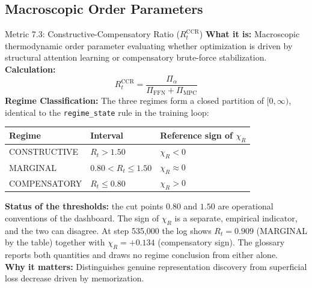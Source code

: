 \documentclass[11pt,a4paper]{article}
\begin{document}
\subsection{Macroscopic Order Parameters}
\begin{metricbox}{Metric 7.3: Constructive-Compensatory Ratio ($R_t^{\text{CCR}}$)}
\textbf{What it is:} Macroscopic thermodynamic order parameter evaluating whether optimization is driven by structural attention learning or compensatory brute-force stabilization.\\
\textbf{Calculation:}
 $$R_t^{\text{CCR}} = \frac{\Pi_\alpha}{\Pi_{\text{FFN}} + \Pi_{\text{MPC}}}$$ \textbf{Regime Classification:} The three regimes form a closed partition of $[0,\infty)$, identical to the \texttt{regime\_state} rule in the training loop:
\begin{center}
\begin{tabular}{@{}lll@{}}
\toprule
\textbf{Regime} & \textbf{Interval} & \textbf{Reference sign of $\chi_R$}\\
\midrule
CONSTRUCTIVE & $R_t > 1.50$ & $\chi_R < 0$\\
MARGINAL & $0.80 < R_t \le 1.50$ & $\chi_R \approx 0$\\
COMPENSATORY & $R_t \le 0.80$ & $\chi_R > 0$\\
\bottomrule
\end{tabular}
\end{center}
\textbf{Status of the thresholds:} the cut points $0.80$ and $1.50$ are operational conventions of the dashboard. The sign of $\chi_R$ is a separate, empirical indicator, and the two can disagree. At step 535,000 the log shows $R_t = 0.909$ (MARGINAL by the table) together with $\chi_R = +0.134$ (compensatory sign). The glossary reports both quantities and draws no regime conclusion from either alone.\\
\textbf{Why it matters:} Distinguishes genuine representation discovery from superficial loss decrease driven by memorization.
\end{metricbox}
\end{document}
